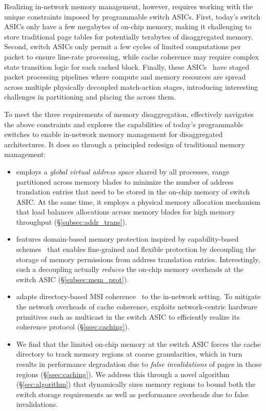 Realizing in-network memory management, however, requires working with the unique constraints imposed by programmable switch ASICs. First, today's switch ASICs only have a few megabytes of on-chip memory, making it challenging to store traditional page tables for potentially terabytes of disaggregated memory. Second, switch ASICs only permit a few cycles of limited computations per packet to ensure line-rate processing, while cache coherence may require complex state transition logic for each cached block. Finally, these ASICs~\cite{p4paper} have staged packet processing pipelines where compute and memory resources are spread across multiple physically decoupled match-action stages, introducing interesting challenges in partitioning and placing the \mmm across them. 

To meet the three requirements of memory disaggregation, \mind effectively navigates the above constraints and explores the capabilities of today's programmable switches to enable in-network memory management for disaggregated architectures. It does so through a principled redesign of traditional memory management:
\begin{itemize}[leftmargin=*, itemsep=0pt]
  \item \mind employs a \textit{global virtual address space} shared by all processes, range partitioned across memory blades to minimize the number of address translation entries that need to be stored in the on-chip memory of switch ASIC. At the same time, it employs a physical memory allocation mechanism that load balances allocations across memory blades for high memory throughput (\S\ref{subsec:addr_trans}).
  \item \mind features domain-based memory protection inspired by capability-based schemes~\cite{capabilityaddr, cap, opal} that enables fine-grained and flexible protection by decoupling the storage of memory permissions from address translation entries. Interestingly, such a decoupling actually \textit{reduces} the on-chip memory overheads at the switch ASIC (\S\ref{subsec:mem_prot}).
  \item \mind adapts directory-based MSI coherence~\cite{msi} to the in-network setting. To mitigate the network overheads of cache coherence, \mind exploits network-centric hardware primitives such as multicast in the switch ASIC to efficiently realize its coherence protocol (\S\ref{ssec:caching}).
  \item We find that the limited on-chip memory at the switch ASIC forces the cache directory to track memory regions at coarse granularities, which in turn results in performance degradation due to \textit{false invalidations} of pages in those regions (\S\ref{ssec:caching}). We address this through a novel \sizing algorithm (\S\ref{sec:algorithm}) that dynamically sizes memory regions to bound both the switch storage requirements as well as performance overheads due to false invalidations.
\end{itemize}
